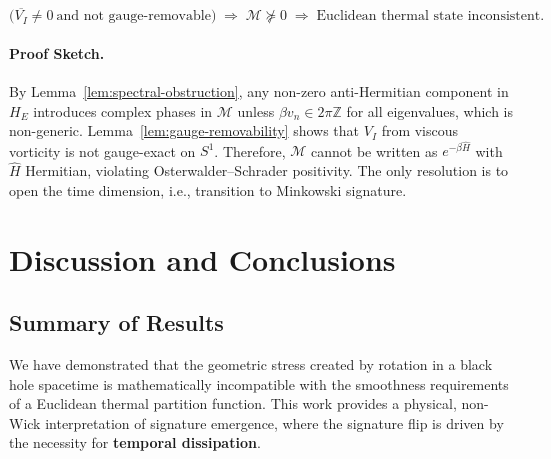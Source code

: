 \documentclass[11pt]{article}
\begin{document}
\begin{equation}
\boxed{
\big( \overline{V_I} \neq 0 \ \text{and not gauge-removable} \big)
\;\Longrightarrow\;
\mathcal{M} \not\succeq 0
\;\Longrightarrow\;
\text{Euclidean thermal state inconsistent.}
}
\end{equation}

\paragraph{Proof Sketch.}
By Lemma~\ref{lem:spectral-obstruction}, any non-zero anti-Hermitian component in $H_E$ introduces complex phases in $\mathcal{M}$ unless $\beta v_n \in 2\pi\mathbb{Z}$ for all eigenvalues, which is non-generic. Lemma~\ref{lem:gauge-removability} shows that $V_I$ from viscous vorticity is not gauge-exact on $S^1$. Therefore, $\mathcal{M}$ cannot be written as $e^{-\beta \widehat{H}}$ with $\widehat{H}$ Hermitian, violating Osterwalder–Schrader positivity. The only resolution is to open the time dimension, i.e., transition to Minkowski signature.

\section{Discussion and Conclusions}

\subsection{Summary of Results}

We have demonstrated that the geometric stress created by rotation in a black hole 
spacetime is mathematically incompatible with the smoothness requirements of a 
Euclidean thermal partition function. This work provides a physical, non-Wick 
interpretation of signature emergence, where the signature flip is driven by the 
necessity for \textbf{temporal dissipation}.
\end{document}

